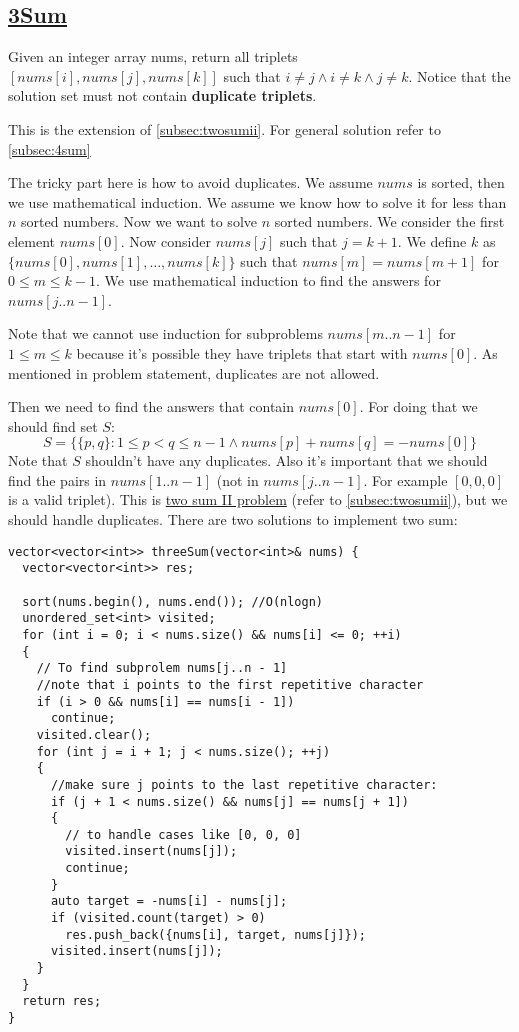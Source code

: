 \documentclass{book}
\begin{document}
	\subsection{\href{https://leetcode.com/problems/3sum/}{3Sum}}
	\label{subsec:3sum}
	Given an integer array nums, return all triplets $[nums[i], nums[j], nums[k]]$ such that $i \ne j \land i \ne k \land j \ne k$. Notice that the solution set must not contain \textbf{duplicate triplets}.
	\par This is the extension of \ref{subsec:twosumii}. For general solution refer to \ref{subsec:4sum}
	\par The tricky part here is how to avoid duplicates. We assume $nums$ is sorted, then we use mathematical induction. We assume we know how to solve it for less than $n$ sorted numbers. Now we want to solve $n$ sorted numbers. We consider the first element $nums[0]$. Now consider $nums[j]$ such that $j = k + 1$. We define $k$ as $\{nums[0], nums[1], \dots, nums[k]\}$ such that $nums[m] = nums[m + 1]$ for $0 \le m \le k - 1$. We use mathematical induction to find the answers for $nums[j..n - 1]$. 
	\par Note that we cannot use induction for subproblems $nums[m..n - 1]$ for $1 \le m \le k$ because it's possible they have triplets that start with $nums[0]$. As mentioned in problem statement, duplicates are not allowed.
	\par Then we need to find the answers that contain $nums[0]$. For doing that we should find set $S$:
	\begin{equation*}
		S = \{\{p, q\}: 1 \le p < q \le n - 1 \land nums[p] + nums[q] = -nums[0]\}
	\end{equation*}
	Note that $S$ shouldn't have any duplicates. Also it's important that we should find the pairs in $nums[1..n - 1]$ (not in $nums[j..n - 1]$. For example $[0, 0, 0]$ is a valid triplet). This is \href{https://leetcode.com/problems/two-sum-ii-input-array-is-sorted/}{two sum II problem} (refer to \ref{subsec:twosumii}), but we should handle duplicates. There are two solutions to implement two sum:
	\begin{lstlisting}
vector<vector<int>> threeSum(vector<int>& nums) {
  vector<vector<int>> res;
  
  sort(nums.begin(), nums.end()); //O(nlogn)
  unordered_set<int> visited;
  for (int i = 0; i < nums.size() && nums[i] <= 0; ++i)
  {
    // To find subprolem nums[j..n - 1]
    //note that i points to the first repetitive character
    if (i > 0 && nums[i] == nums[i - 1])
      continue;
    visited.clear();
    for (int j = i + 1; j < nums.size(); ++j)
    {
      //make sure j points to the last repetitive character:
      if (j + 1 < nums.size() && nums[j] == nums[j + 1])
      {
        // to handle cases like [0, 0, 0]
        visited.insert(nums[j]);
        continue;
      }
      auto target = -nums[i] - nums[j];
      if (visited.count(target) > 0)
        res.push_back({nums[i], target, nums[j]});
      visited.insert(nums[j]);
    }
  }
  return res;
}
	\end{lstlisting}
\end{document}
